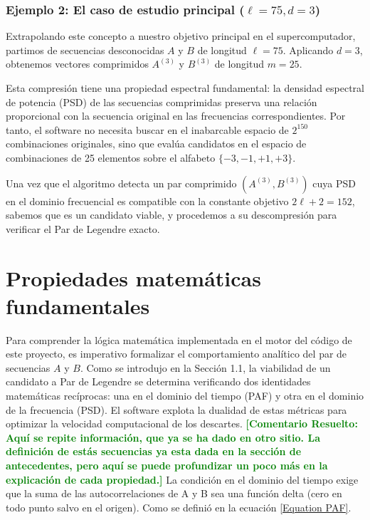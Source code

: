 \documentclass[12pt,a4paper]{tfg_domingo}
\newcommand{\ComentarioR}[1]{\textcolor{green}{\textbf{[Comentario Resuelto:
#1]}}}
\begin{document}
\subsubsection*{Ejemplo 2: El caso de estudio principal ($\ell=75, d=3$)}

Extrapolando este concepto a nuestro objetivo principal en el supercomputador, partimos de secuencias desconocidas $A$ y $B$ de longitud $\ell=75$. Aplicando $d=3$, obtenemos vectores comprimidos $A^{(3)}$ y $B^{(3)}$ de longitud $m=25$.

Esta compresión tiene una propiedad espectral fundamental: la densidad espectral de potencia (PSD) de las secuencias comprimidas preserva una relación proporcional con la secuencia original en las frecuencias correspondientes. Por tanto, el software no necesita buscar en el inabarcable espacio de $2^{150}$ combinaciones originales, sino que evalúa candidatos en el espacio de combinaciones de 25 elementos sobre el alfabeto $\{-3, -1, +1, +3\}$. 

Una vez que el algoritmo detecta un par comprimido $(A^{(3)}, B^{(3)})$ cuya PSD en el dominio frecuencial es compatible con la constante objetivo $2\ell + 2 = 152$, sabemos que es un candidato viable, y procedemos a su descompresión para verificar el Par de Legendre exacto.


\section{Propiedades matemáticas fundamentales}

Para comprender la lógica matemática implementada en el motor del código de este proyecto, es imperativo formalizar el comportamiento analítico del par de secuencias $A$ y $B$. Como se introdujo en la Sección 1.1, la viabilidad de un candidato a Par de Legendre se determina verificando dos identidades matemáticas recíprocas: una en el dominio del tiempo (PAF) y otra en el dominio de la frecuencia (PSD). El software explota la dualidad de estas métricas para optimizar la velocidad computacional de los descartes.
\ComentarioR{Aquí se repite información, que ya se ha dado en otro
  sitio. La definición de estás secuencias ya esta dada en la sección de antecedentes, pero aquí se puede profundizar un poco más en la explicación de cada propiedad.}
La condición en el dominio del tiempo exige que la suma de las autocorrelaciones de A y B sea una función delta (cero en todo punto salvo en el origen). Como se definió en la ecuación \eqref{Equation PAF}.
\end{document}
